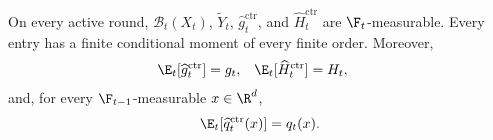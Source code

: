 \begin{lemma}
    \label{lem:ctr-unbiasedness}
    On every active round, $\mathcal B_t(X_t)$, $\widetilde Y_t$,
    $\widehat g_t^{\mathrm{ctr}}$, and $\widehat H_t^{\mathrm{ctr}}$ are
    $\F_t$-measurable.  Every entry has a finite conditional moment of every
    finite order.  Moreover,
    \begin{align}
        \E_t[\widehat g_t^{\mathrm{ctr}}] & =g_t,
                                          &
        \E_t[\widehat H_t^{\mathrm{ctr}}] & =H_t,
        \label{eq:ctr-unbiasedness}
    \end{align}
    and, for every $\F_{t-1}$-measurable $x\in\R^d$,
    \begin{align}
        \E_t[\widehat q_t^{\mathrm{ctr}}(x)]=q_t(x).
        \label{eq:ctr-q-unbiasedness}
    \end{align}
\end{lemma}

